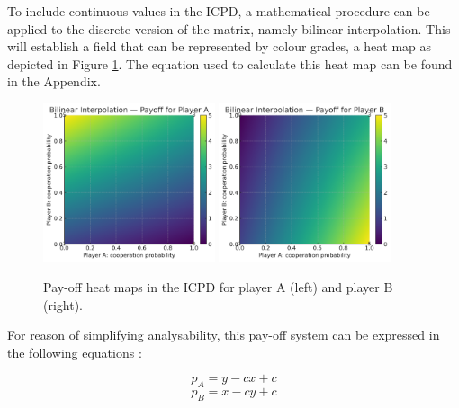 \documentclass[11pt]{article}
\begin{document}
To include continuous values in the ICPD, a mathematical procedure can be applied to the discrete version of the matrix, namely bilinear interpolation.
This will establish a field that can be represented by colour grades, a heat map as depicted in Figure \ref{fig:heatmaps}.
The equation used to calculate this heat map can be found in the Appendix.

\begin{figure}[h]
	\centering
	\includegraphics[width=0.45\textwidth]{images/pd_heatmap_A}\hfill
	\includegraphics[width=0.45\textwidth]{images/pd_heatmap_B}
	\caption{Pay-off heat maps in the ICPD for player A (left) and player B (right).}
	\label{fig:heatmaps}
\end{figure}

%
%
For reason of simplifying analysability, this pay-off system can be expressed in the following equations \cite[cf.][p.~259]{LB07}:

\begin{equation}
	p_A = y - c x + c
\end{equation}
\begin{equation}
	p_B = x - c y + c
\end{equation}
\end{document}
